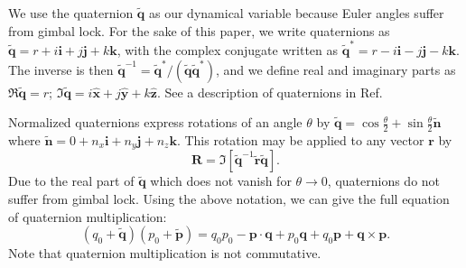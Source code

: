 \documentclass[linenumbers]{aastex631}
\newcommand{\unit}[1]{\hat{\mathbf{#1}}}
\newcommand{\brackets}[1]{\left[ #1 \right]}
\newcommand{\quat}[1]{\widetilde{\bm{#1}}}
\begin{document}
We use the quaternion $\quat q$ as our dynamical variable because Euler angles suffer from gimbal lock. For the sake of this paper, we write quaternions as $\quat q = r + i \bm i + j \bm j + k \bm k$, with the complex conjugate written as $\quat q^* = r - i \bm i - j \bm j - k \bm k$. The inverse is then $\quat q^{-1} = \quat q^* / (\quat q \quat q^*)$, and we define real and imaginary parts as $\Re \quat q = r$; $\Im \quat q = i \unit x + j \unit y + k \unit z$. See a description of quaternions in Ref.~\cite{2008arXiv0811.2889G}

Normalized quaternions express rotations of an angle $\theta$ by $\quat q = \cos\frac{\theta}{2} + \sin\frac{\theta}{2}\quat n$ where $\quat n = 0 + n_x \bm i + n_y \bm j + n_z\bm k$. This rotation may be applied to any vector $\bm r$ by
\begin{equation}
\bm R = \Im \brackets{\quat q^{-1} \quat r\quat q }.
\label{eqn:quat-rot}
\end{equation}
Due to the real part of $\quat q$ which does not vanish for $\theta \rightarrow 0$, quaternions do not suffer from gimbal lock. Using the above notation, we can give the full equation of quaternion multiplication:
\begin{equation}
(q_0 + \quat q) (p_0 + \quat p) = q_0 p_0 - \bm p \cdot \bm q + p_0 \bm q + q_0 \bm p + \bm q \times \bm p.
\label{eqn:quat-mult}
\end{equation}
Note that quaternion multiplication is not commutative.
\end{document}

